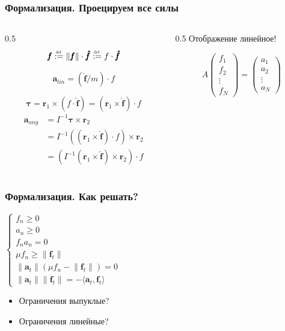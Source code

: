 \documentclass{beamer}
\newcommand{\norm}[1]{\lVert#1\rVert}
\begin{document}
\begin{frame}
\frametitle{Формализация. Проецируем все силы}
        \begin{columns}
        \begin{column}[T]{0.5\textwidth}
        \[    
        \pmb{f} \defeq \norm{\pmb{f}} \cdot \pmb{\hat{f}} \defeq f \cdot \pmb{\hat{f}}
        \]
        
        \[
        \pmb{a}_{lin} = (\pmb{\hat{f}}/m) \cdot f        
        \]
        
        \[
        \pmb{\tau} = \pmb{r}_1 \times (f \cdot \pmb{\hat{f}}) = (\pmb{r}_1 \times \pmb{\hat{f}}) \cdot f
        \]
        \begin{align*} 
            \pmb{a}_{ang} &= I^{-1} \pmb{\tau} \times \pmb{r}_2 \\
            &= I^{-1} ((\pmb{r}_1 \times \pmb{\hat{f}}) \cdot f) \times \pmb{r}_2 \\
            &= (I^{-1} (\pmb{r}_1 \times \pmb{\hat{f}}) \times \pmb{r}_2) \cdot f
        \end{align*}
        \end{column}

        \begin{column}[T]{0.5\textwidth}
        Отображение линейное!

        \[A
        \begin{pmatrix} f_1 \\ f_2 \\ \vdots \\ f_{N} \end{pmatrix}
        =
        \begin{pmatrix} a_1 \\ a_2 \\ \vdots \\ a_N \end{pmatrix}
        \]
        \end{column}
        \end{columns}
\end{frame}

\begin{frame}[t]
\frametitle{Формализация. Как решать?}
    \small
    $
    \begin{cases}
        f_n \ge 0 \\
        a_n \ge 0 \\
        f_n a_n = 0 \\ 
        \mu f_n \ge \norm{\pmb{f}_t} \\
        \norm{\pmb{a}_t} (\mu f_n - \norm{\pmb{f}_t}) = 0 \\
        \norm{\pmb{a}_t} \norm{\pmb{f}_t} = - \langle \pmb{a}_t, \pmb{f}_t \rangle
    \end{cases}
    $

    \begin{itemize}
        \item Ограничения выпуклые?
        \item Ограничения линейные?
    \end{itemize}
\end{frame}
\end{document}
